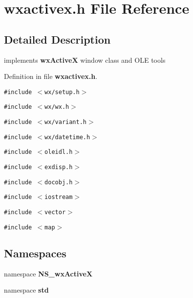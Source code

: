 \section{wxactivex.h File Reference}
\label{wxactivex_8h}


\subsection{Detailed Description}
implements {\bf wx\-Active\-X} window class and OLE tools



Definition in file {\bf wxactivex.h}.

{\tt \#include $<$wx/setup.h$>$}\par
{\tt \#include $<$wx/wx.h$>$}\par
{\tt \#include $<$wx/variant.h$>$}\par
{\tt \#include $<$wx/datetime.h$>$}\par
{\tt \#include $<$oleidl.h$>$}\par
{\tt \#include $<$exdisp.h$>$}\par
{\tt \#include $<$docobj.h$>$}\par
{\tt \#include $<$iostream$>$}\par
{\tt \#include $<$vector$>$}\par
{\tt \#include $<$map$>$}\par
\subsection*{Namespaces}
\begin{CompactItemize}
\item 
namespace {\bf NS\_\-wx\-Active\-X}
\item 
namespace {\bf std}
\end{CompactItemize}
